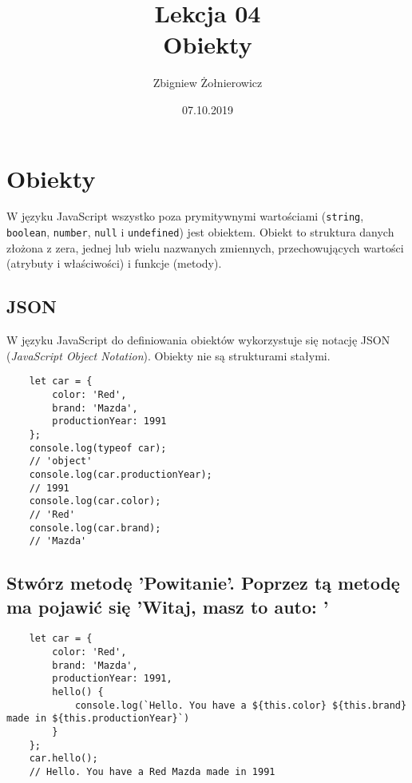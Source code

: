 \documentclass[a4paper]{article}
\begin{document}
\title{{\huge Lekcja 04} \\
    {\Large Obiekty}}
\author{Zbigniew Żołnierowicz}
\date{07.10.2019}
\maketitle
\section{Obiekty}
W języku JavaScript wszystko poza prymitywnymi wartościami ({\tt string}, {\tt boolean}, {\tt number}, {\tt null} i {\tt undefined}) jest obiektem. Obiekt to struktura danych złożona z zera, jednej lub wielu nazwanych zmiennych, przechowujących wartości (atrybuty i właściwości) i funkcje (metody).

\subsection*{JSON}
W języku JavaScript do definiowania obiektów wykorzystuje się notację JSON (\emph{JavaScript Object Notation}). Obiekty nie są strukturami stałymi.
\begin{verbatim}
    let car = {
        color: 'Red',
        brand: 'Mazda',
        productionYear: 1991
    };
    console.log(typeof car);
    // 'object'
    console.log(car.productionYear);
    // 1991
    console.log(car.color);
    // 'Red'
    console.log(car.brand);
    // 'Mazda'
\end{verbatim}
\pagebreak
\subsection*{Stwórz metodę 'Powitanie'. Poprzez tą metodę ma pojawić się 'Witaj, masz to auto: '}
\begin{verbatim}
    let car = {
        color: 'Red',
        brand: 'Mazda',
        productionYear: 1991,
        hello() {
            console.log(`Hello. You have a ${this.color} ${this.brand} made in ${this.productionYear}`)
        }
    };
    car.hello();
    // Hello. You have a Red Mazda made in 1991
\end{verbatim}
\end{document}
